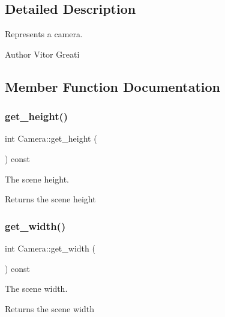 \subsection{Detailed Description}
Represents a camera. 

\begin{DoxyAuthor}{Author}
Vitor Greati 
\end{DoxyAuthor}


\subsection{Member Function Documentation}
\mbox{\label{class_camera_aa007c293cb55efbdf952c8827ada39fe}} 
\subsubsection{\texorpdfstring{get\_height()}{get\_height()}}
{\footnotesize\ttfamily int Camera\+::get\+\_\+height (\begin{DoxyParamCaption}{ }\end{DoxyParamCaption}) const\hspace{0.3cm}{\ttfamily [inline]}}



The scene height. 

\begin{DoxyReturn}{Returns}
the scene height 
\end{DoxyReturn}
\mbox{\label{class_camera_ac987a00c51804d616aa9813acf3d1b5b}} 
\subsubsection{\texorpdfstring{get\_width()}{get\_width()}}
{\footnotesize\ttfamily int Camera\+::get\+\_\+width (\begin{DoxyParamCaption}{ }\end{DoxyParamCaption}) const\hspace{0.3cm}{\ttfamily [inline]}}



The scene width. 

\begin{DoxyReturn}{Returns}
the scene width 
\end{DoxyReturn}
\mbox{\label{class_camera_a32ef096bdf350255ff195cdaed585342}} 

